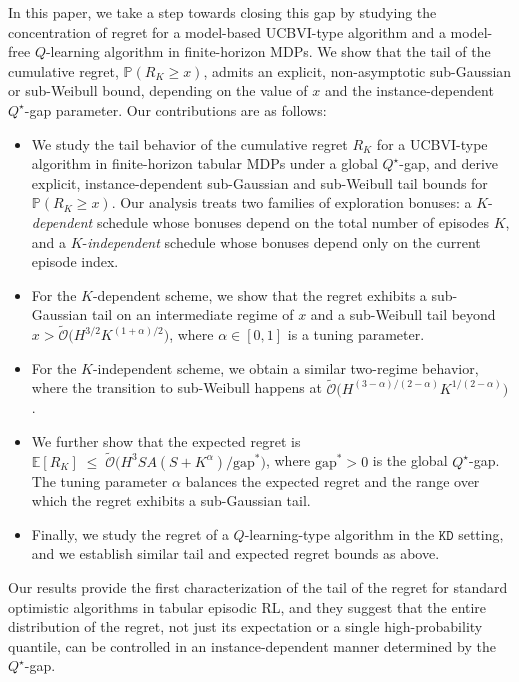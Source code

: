 \documentclass[11pt]{article}
\newcommand{\PP}{\mathbb{P}}
\newcommand{\KD} {\texttt{KD}}
\newcommand{\gapstar}{\mathrm{gap}^*}
\begin{document}
In this paper, we take a step towards closing this gap by studying the concentration of regret for a model-based UCBVI-type algorithm and a model-free $Q$-learning algorithm in finite-horizon MDPs. We show that the tail of the cumulative regret, $\PP(R_K \ge x)$, admits an explicit, non-asymptotic sub-Gaussian or sub-Weibull bound, depending on the value of $x$ and the instance-dependent $Q^\star$-gap parameter. Our contributions are as follows:
\begin{itemize}[leftmargin=*]
    \item We study the tail behavior of the cumulative regret $R_K$ for a UCBVI-type algorithm in finite-horizon tabular MDPs under a global $Q^\star$-gap, and derive explicit, instance-dependent sub-Gaussian and sub-Weibull tail bounds for $\PP(R_K \ge x)$. Our analysis treats two families of exploration bonuses: a $K$-\emph{dependent} schedule whose bonuses depend on the total number of episodes $K$, and a $K$-\emph{independent} schedule whose bonuses depend only on the current episode index. 
    
    \item For the $K$-dependent scheme, we show that the regret exhibits a sub-Gaussian tail on an intermediate regime of $x$ and a sub-Weibull tail beyond $x>\tilde{\mathcal{O}}\!\big(H^{3/2}K^{(1+\alpha)/2}\big)$, where $\alpha \in [0,1]$ is a tuning parameter.

    \item For the $K$-independent scheme, we obtain a similar two-regime behavior, where the transition to sub-Weibull happens at $\tilde{\mathcal{O}}\!\big(H^{(3-\alpha)/(2-\alpha)}K^{1/(2-\alpha)}\big)$.

    \item We further show that the expected regret is $\mathbb{E}[R_K]        \;\le \;\tilde{\mathcal{O}}\!\Big(H^3SA(S+K^\alpha)/\gapstar\Big)$, where $\gapstar>0$ is the global $Q^\star$-gap. The tuning parameter $\alpha$ balances the expected regret and the range over which the regret exhibits a sub-Gaussian tail.

    \item Finally, we study the regret of a $Q$-learning-type algorithm in the $\KD$ setting, and we establish similar tail and expected regret bounds as above.
\end{itemize}

Our results provide the first characterization of the tail of the regret for standard optimistic algorithms in tabular episodic RL, and they suggest that the entire distribution of the regret, not just its expectation or a single high-probability quantile, can be controlled in an instance-dependent manner determined by the $Q^\star$-gap.
\end{document}
